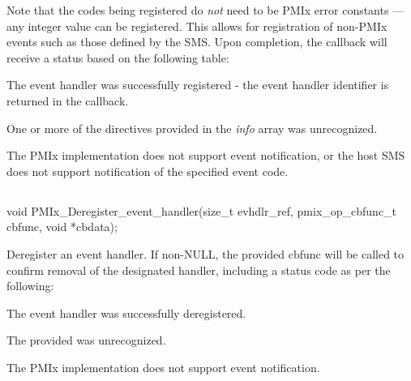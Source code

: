 Note that the codes being registered do \textit{not} need to be \ac{PMIx} error constants --- any integer value can be registered. This allows for registration of non-PMIx events such as those defined by the \ac{SMS}. Upon completion, the callback will receive a status based on the following table:

\begin{constantdesc}
\item {} The event handler was successfully registered - the event handler identifier is returned in the callback.
\item {} One or more of the directives provided in the \textit{info} array was unrecognized.
\item {} The \ac{PMIx} implementation does not support event notification, or the host \ac{SMS} does not support notification of the specified event code.
\end{constantdesc}



\subsection{}

\cspecificstart
\begin{codepar}
void
PMIx_Deregister_event_handler(size_t evhdlr_ref,
                              pmix_op_cbfunc_t cbfunc,
                              void *cbdata);
\end{codepar}
\cspecificend

\begin{arglist}
\end{arglist}

\descr

Deregister an event handler. If non-NULL, the provided cbfunc will be called to confirm removal of the designated handler, including a status code as per the following:

\begin{constantdesc}
\item {} The event handler was successfully deregistered.
\item {} The provided  was unrecognized.
\item {} The \ac{PMIx} implementation does not support event notification.
\end{constantdesc}


